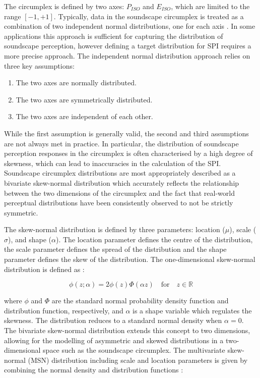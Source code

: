 \documentclass[
  authoryear,
  preprint,
  1p]{elsarticle}
\providecommand{\tightlist}{%
  \setlength{\itemsep}{0pt}\setlength{\parskip}{0pt}}\usepackage{longtable,booktabs,array}
\begin{document}
The circumplex is defined by two axes: \(P_{ISO}\) and \(E_{ISO}\),
which are limited to the range \([-1, +1]\). Typically, data in the
soundscape circumplex is treated as a combination of two independent
normal distributions, one for each axis
\citep{Mitchell2022How, Ooi2022Probably}. In some applications this
approach is sufficient for capturing the distribution of soundscape
perception, however defining a target distribution for SPI requires a
more precise approach. The independent normal distribution approach
relies on three key assumptions:

\begin{enumerate}
\def\labelenumi{\arabic{enumi}.}
\tightlist
\item
  The two axes are normally distributed.
\item
  The two axes are symmetrically distributed.
\item
  The two axes are independent of each other.
\end{enumerate}

While the first assumption is generally valid, the second and third
assumptions are not always met in practice. In particular, the
distribution of soundscape perception responses in the circumplex is
often characterised by a high degree of skewness, which can lead to
inaccuracies in the calculation of the SPI. Soundscape circumplex
distributions are most appropriately described as a bivariate
skew-normal distribution \citep{Azzalini2005Skew} which accurately
reflects the relationship between the two dimensions of the circumplex
and the fact that real-world perceptual distributions have been
consistently observed to not be strictly symmetric.

The skew-normal distribution is defined by three parameters: location
(\(\mu\)), scale (\(\sigma\)), and shape (\(\alpha\)). The location
parameter defines the centre of the distribution, the scale parameter
defines the spread of the distribution and the shape parameter defines
the skew of the distribution. The one-dimensional skew-normal
distribution is defined as \citep{Azzalini1996Multivariate}:

\[
\phi(z; \alpha) = 2 \phi(z) \Phi(\alpha z) \quad \text{for} \quad z \in \mathbb{R}
\]

where \(\phi\) and \(\Phi\) are the standard normal probability density
function and distribution function, respectively, and \(\alpha\) is a
shape variable which regulates the skewness. The distribution reduces to
a standard normal density when \(\alpha = 0\). The bivariate skew-normal
distribution extends this concept to two dimensions, allowing for the
modelling of asymmetric and skewed distributions in a two-dimensional
space such as the soundscape circumplex. The multivariate skew-normal
(MSN) distribution including scale and location parameters is given by
combining the normal density and distribution functions
\citep{Azzalini1999Statistical}:
\end{document}
